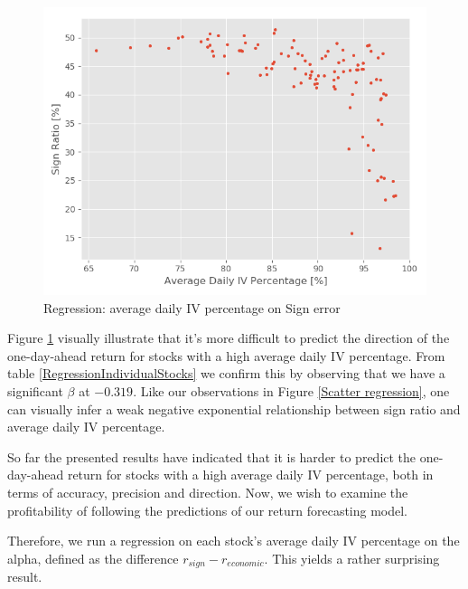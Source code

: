 \begin{figure}[h]
    \centering
    \includegraphics[scale = 0.5]{Plot/IndividualStockRegression1.png}
    \caption{Regression: average daily IV percentage on Sign error}
    \label{IVSignError}
\end{figure}

Figure \ref{IVSignError} visually illustrate that it's more difficult to predict the direction of the one-day-ahead return for stocks with a high average daily IV percentage. From table \ref{RegressionIndividualStocks} we confirm this by observing that we have a significant $\beta$ at $-0.319$. Like our observations in Figure \ref{Scatter regression}, one can visually infer a weak negative exponential relationship between sign ratio and average daily IV percentage.

So far the presented results have indicated that it is harder to predict the one-day-ahead return for stocks with a high average daily IV percentage, both in terms of accuracy, precision and direction. Now, we wish to examine the profitability of following the predictions of our return forecasting model. 

Therefore, we run a regression on each stock’s average daily IV percentage on the alpha, defined as the difference $r_{sign}-r_{economic}$. This yields a rather surprising result.

